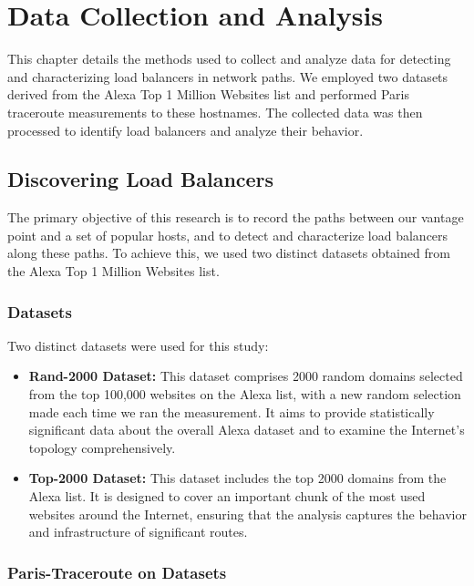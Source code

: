 \documentclass[12pt]{cwru_thesis}
\begin{document}
\chapter{Data Collection and Analysis}

This chapter details the methods used to collect and analyze data for detecting and characterizing load balancers in network paths. We employed two datasets derived from the Alexa Top 1 Million Websites list and performed Paris traceroute measurements to these hostnames. The collected data was then processed to identify load balancers and analyze their behavior.

\section{Discovering Load Balancers}

The primary objective of this research is to record the paths between our vantage point and a set of popular hosts, and to detect and characterize load balancers along these paths. To achieve this, we used two distinct datasets obtained from the Alexa Top 1 Million Websites list.

\subsection{Datasets}

Two distinct datasets were used for this study:
\begin{itemize}
   \item \textbf{Rand-2000 Dataset:} This dataset comprises 2000 random domains selected from the top 100,000 websites on the Alexa list, with a new random selection made each time we ran the measurement. It aims to provide statistically significant data about the overall Alexa dataset and to examine the Internet's topology comprehensively.

    \item \textbf{Top-2000 Dataset:} This dataset includes the top 2000 domains from the Alexa list. It is designed to cover an important chunk of the most used websites around the Internet, ensuring that the analysis captures the behavior and infrastructure of significant routes.
\end{itemize}

\subsection{Paris-Traceroute on Datasets}
\end{document}
